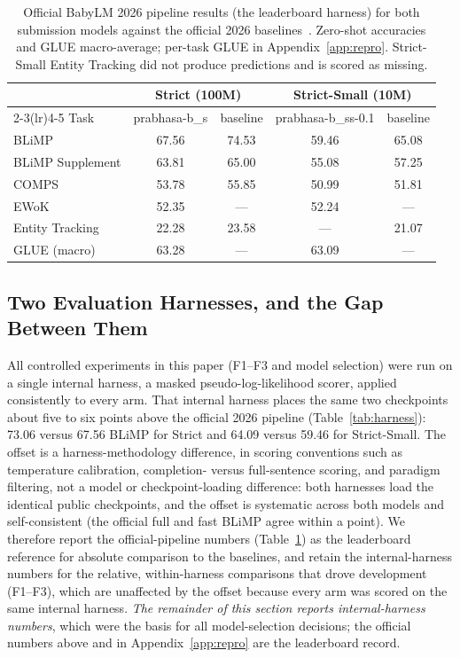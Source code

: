 \begin{table}[t]
\centering
\caption{Official BabyLM 2026 pipeline results (the leaderboard harness) for both submission models against the official 2026 baselines~\cite{Hu2024BabyLM}. Zero-shot accuracies and GLUE macro-average; per-task GLUE in Appendix~\ref{app:repro}. Strict-Small Entity Tracking did not produce predictions and is scored as missing.}
\label{tab:official}
{\small
\begin{tabular}{lcccc}
\toprule
 & \multicolumn{2}{c}{Strict (100M)} & \multicolumn{2}{c}{Strict-Small (10M)} \\
\cmidrule(lr){2-3}\cmidrule(lr){4-5}
Task & prabhasa-b\_s & baseline & prabhasa-b\_ss-0.1 & baseline \\
\midrule
BLiMP & 67.56 & 74.53 & 59.46 & 65.08 \\
BLiMP Supplement & 63.81 & 65.00 & 55.08 & 57.25 \\
COMPS & 53.78 & 55.85 & 50.99 & 51.81 \\
EWoK & 52.35 & — & 52.24 & — \\
Entity Tracking & 22.28 & 23.58 & — & 21.07 \\
GLUE (macro) & 63.28 & — & 63.09 & — \\
\bottomrule
\end{tabular}
}
\end{table}

\subsection{Two Evaluation Harnesses, and the Gap Between Them}
\label{subsec:harness}

All controlled experiments in this paper (F1--F3 and model selection) were run on a single internal harness, a masked pseudo-log-likelihood scorer, applied consistently to every arm. That internal harness places the same two checkpoints about five to six points above the official 2026 pipeline (Table~\ref{tab:harness}): 73.06 versus 67.56 BLiMP for Strict and 64.09 versus 59.46 for Strict-Small. The offset is a harness-methodology difference, in scoring conventions such as temperature calibration, completion- versus full-sentence scoring, and paradigm filtering, not a model or checkpoint-loading difference: both harnesses load the identical public checkpoints, and the offset is systematic across both models and self-consistent (the official full and fast BLiMP agree within a point). We therefore report the official-pipeline numbers (Table~\ref{tab:official}) as the leaderboard reference for absolute comparison to the baselines, and retain the internal-harness numbers for the relative, within-harness comparisons that drove development (F1--F3), which are unaffected by the offset because every arm was scored on the same internal harness. \emph{The remainder of this section reports internal-harness numbers}, which were the basis for all model-selection decisions; the official numbers above and in Appendix~\ref{app:repro} are the leaderboard record.

